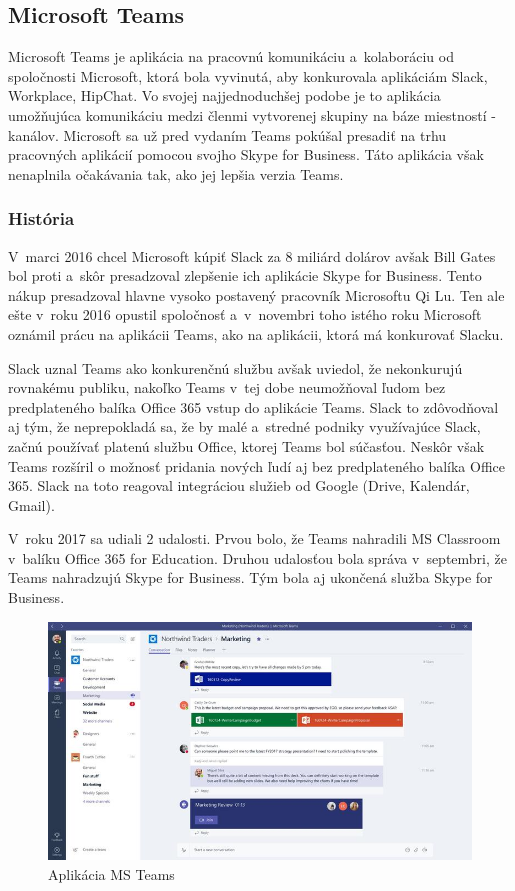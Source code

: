 \subsection{Microsoft Teams}
\indent Microsoft Teams je aplikácia na pracovnú komunikáciu a kolaboráciu od spoločnosti Microsoft, ktorá bola vyvinutá, aby konkurovala aplikáciám Slack, Workplace, HipChat. Vo svojej najjednoduchšej podobe je to aplikácia umožňujúca komunikáciu medzi členmi vytvorenej skupiny na báze miestností - kanálov. Microsoft sa už pred vydaním Teams pokúšal presadiť na trhu pracovných aplikácií pomocou svojho Skype for Business. Táto aplikácia však nenaplnila očakávania tak, ako jej lepšia verzia Teams. 
\subsubsection{História}
\indent V marci 2016 chcel Microsoft kúpiť Slack za 8 miliárd dolárov avšak Bill Gates bol proti a skôr presadzoval zlepšenie ich aplikácie Skype for Business. Tento nákup presadzoval hlavne vysoko postavený pracovník Microsoftu Qi Lu. Ten ale ešte v roku 2016 opustil spoločnosť a v novembri toho istého roku Microsoft oznámil prácu na aplikácii Teams, ako na aplikácii, ktorá má konkurovať Slacku. 

\indent Slack uznal Teams ako konkurenčnú službu avšak uviedol, že nekonkurujú rovnakému publiku, nakoľko Teams v tej dobe neumožňoval ľudom bez predplateného balíka Office 365 vstup do aplikácie Teams. Slack to zdôvodňoval aj tým, že neprepokladá sa, že by malé a stredné podniky využívajúce Slack, začnú používať platenú službu Office, ktorej Teams bol súčasťou. Neskôr však Teams rozšíril o možnosť pridania nových ľudí aj bez predplateného balíka Office 365. Slack na toto reagoval integráciou služieb od Google (Drive, Kalendár, Gmail). 

\indent V roku 2017 sa udiali 2 udalosti. Prvou bolo, že Teams nahradili MS Classroom v balíku Office 365 for Education. Druhou udalosťou bola správa v septembri, že Teams nahradzujú Skype for Business. Tým bola aj ukončená služba Skype for Business. 

\begin{figure}[H]
    \centering
    \includegraphics[scale=0.70]{img/obr-ms-teams.jpg}
    \caption{Aplikácia MS Teams}
    \label{fig:img-ms-teams}
\end{figure}

